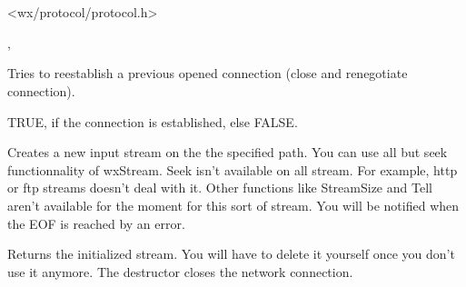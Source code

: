 \section{}\label{wxprotocol}




<wx/protocol/protocol.h>


, 



\label{wxprotoreconnect}


Tries to reestablish a previous opened connection (close and renegotiate connection).


TRUE, if the connection is established, else FALSE.

\label{wxprotogetinput}


Creates a new input stream on the the specified path. You can use all but seek
functionnality of wxStream. Seek isn't available on all stream. For example,
http or ftp streams doesn't deal with it. Other functions like StreamSize and
Tell aren't available for the moment for this sort of stream.
You will be notified when the EOF is reached by an error.


Returns the initialized stream. You will have to delete it yourself once you
don't use it anymore. The destructor closes the network connection.



\label{wxprotoabort}

